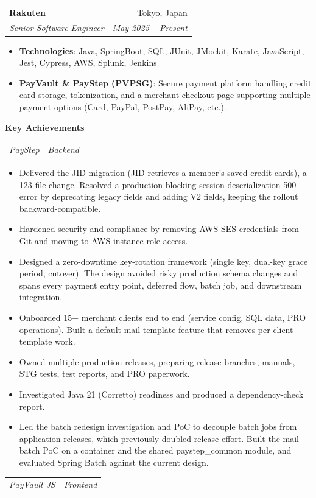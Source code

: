 \documentclass[letterpaper,11pt]{article}
\makeatletter
\newcommand{\resumeItem}[2]{
  \item\small{
    \textbf{#1}{: #2 \vspace{-2pt}}
  }
}
\newcommand{\resumeSubSubItem}[1]{
  \item\small{
    {#1 \vspace{-2pt}}
  }
}
\newcommand{\resumeSubheading}[4]{
  \vspace{-1pt}\item
    \begin{tabular*}{0.97\textwidth}[t]{l@{\extracolsep{\fill}}r}
      \textbf{#1} & #2 \\
      \textit{\small #3} & \textit{\small #4} \\
    \end{tabular*}\vspace{-5pt}
}
\newcommand{\resumeSubSubheading}[2]{
    \begin{tabular*}{0.97\textwidth}{l@{\extracolsep{\fill}}r}
      \textit{\small #1} & \textit{\small #2} \\
    \end{tabular*}\vspace{-5pt}
}
\newcommand{\resumeItemListStart}{\begin{itemize}}
\newcommand{\resumeItemListEnd}{\end{itemize}\vspace{-5pt}}
\makeatother
\begin{document}
    \resumeSubheading
      {Rakuten}{Tokyo, Japan}
      {Senior Software Engineer}{May 2025 -- Present}
      \resumeItemListStart
        \resumeItem{Technologies}
          {Java, SpringBoot, SQL, JUnit, JMockit, Karate, JavaScript, Jest, Cypress, AWS, Splunk, Jenkins}
        \resumeItem{PayVault \& PayStep (PVPSG)}
          {Secure payment platform handling credit card storage, tokenization, and a merchant checkout page supporting multiple payment options (Card, PayPal, PostPay, AliPay, etc.).}
      \resumeItemListEnd
   \textbf{\small Key Achievements}
   \resumeSubSubheading
    {PayStep}{Backend}
    \resumeItemListStart
      \resumeSubSubItem
        {Delivered the JID migration (JID retrieves a member's saved credit cards), a 123-file change. Resolved a production-blocking session-deserialization 500 error by deprecating legacy fields and adding V2 fields, keeping the rollout backward-compatible.}
      \resumeSubSubItem
        {Hardened security and compliance by removing AWS SES credentials from Git and moving to AWS instance-role access.}
      \resumeSubSubItem
        {Designed a zero-downtime key-rotation framework (single key, dual-key grace period, cutover). The design avoided risky production schema changes and spans every payment entry point, deferred flow, batch job, and downstream integration.}
      \resumeSubSubItem
        {Onboarded 15+ merchant clients end to end (service config, SQL data, PRO operations). Built a default mail-template feature that removes per-client template work.}
      \resumeSubSubItem
        {Owned multiple production releases, preparing release branches, manuals, STG tests, test reports, and PRO paperwork.}
      \resumeSubSubItem
        {Investigated Java 21 (Corretto) readiness and produced a dependency-check report.}
      \resumeSubSubItem
        {Led the batch redesign investigation and PoC to decouple batch jobs from application releases, which previously doubled release effort. Built the mail-batch PoC on a container and the shared paystep\_common module, and evaluated Spring Batch against the current design.}
    \resumeItemListEnd
  \resumeSubSubheading
    {PayVault JS}{Frontend}
\end{document}
